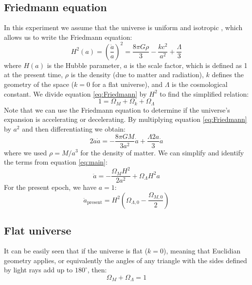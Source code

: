\documentclass[11pt]{article}
\begin{document}
\subsection{Friedmann equation}
In this experiment we assume that the universe is uniform and isotropic \cite{AS37_lab_script}, which allows us to write the Friedmann equation: 
\begin{equation}
	H^2(a) = \left( \frac{\dot{a}}{a} \right)^2 = \frac{8 \pi G \rho}{3} - \frac{k c^2}{a^2} + \frac{\Lambda}{3}
	\label{eq:Friedmann}
\end{equation}
where $H(a)$ is the Hubble parameter, $a$ is the scale factor, which is defined as 1 at the present time, $\rho$ is the density (due to matter and radiation), $k$ defines the geometry of the space ($k=0$ for a flat universe), and $\Lambda$ is the cosmological constant. We divide equation \eqref{eq:Friedmann} by $H^2$ to find the simplified relation: 
\begin{equation}
	1 = \Omega_M +\Omega_k + \Omega_\Lambda
	\label{eq:main}
\end{equation}
Note that we can use the Friedmann equation to determine if the universe's expansion is accelerating or decelerating. By multiplying equation \eqref{eq:Friedmann} by $a^2$ and then differentiating we obtain: 
\begin{equation}
	2 \ddot{a} \dot{a} = -\frac{8 \pi G M}{3 a^2} \dot{a} + \frac{\Lambda 2 a}{3}  \dot{a}
\end{equation}
where we used $\rho = M/a^3$ for the density of matter. We can simplify and identify the terms from equation \eqref{eq:main}:
\begin{equation}
	\ddot{a} = -\frac{\Omega_M H^2}{2 a^2} + \Omega_{\Lambda} H^2 a
\end{equation}
For the present epoch, we have $a = 1$: 
\begin{equation}
	\ddot{a}_{\mathrm{present}} = H^2 \left(\Omega_{\Lambda,0} - \frac{\Omega_{M,0}}{2}\right)
	\label{eq:exp}
\end{equation}

\subsection{Flat universe}
It can be easily seen that if the universe is flat ($k = 0$), meaning that Euclidian geometry applies, or equivalently the angles of any triangle with the sides defined by light rays add up to $180^\circ$, then: 
\begin{equation}
	\Omega_M + \Omega_\Lambda = 1
	\label{eq:flat}
\end{equation}
\end{document}

